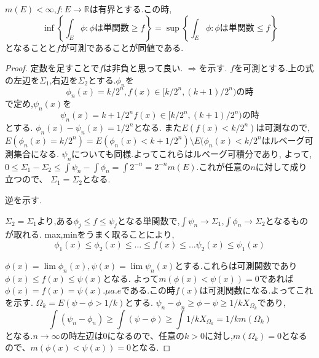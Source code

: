 \begin{thm}
 $m(E) < \infty$,$f: E \to \mathbb{R}$は有界とする.この時,
 \begin{equation*}
     \inf \left\{ \int_E \phi: \phi \mbox{は単関数} \ge f \right\} = \sup \left\{ \int_E \phi: \phi \mbox{は単関数} \le f\right\}
 \end{equation*}
となることと$f$が可測であることが同値である.
\end{thm}
\begin{proof}
定数を足すことで$f$は非負と思って良い.
$\Rightarrow$を示す. $f$を可測とする.上の式の左辺を$\Sigma_1$,右辺を$\Sigma_2$とする.$\phi_n$を
\begin{equation*}
    \phi_n(x) = 
    k/2^n, f(x) \in [k/2^n, (k+1)/2^n) \mbox{の時}
\end{equation*}
で定め,$\psi_n(x)$を
\begin{equation*}
    \psi_n(x) = k+1/2^n  f(x) \in [k/2^n, (k+1)/2^n) \mbox{の時}
\end{equation*}
とする.
$\phi_n(x) - \psi_n(x) = 1/2^n$となる.
また$E(f(x) < k/2^n)$は可測なので,$E(\phi_n(x) = k/2^n) = E(\phi_n(x) < k+1/2^n) \setminus E(\phi_n(x) < k/2^n$はルベーグ可測集合になる.
$\psi_n$についても同様.よってこれらはルベーグ可積分であり,
よって,$0 \le \Sigma_1 - \Sigma_2 \le \int \psi_n - \int \phi_n = \int 2^{-n} = 2^{-n}m(E)$.これが任意の$n$に対して成り立つので、
$\Sigma_1 = \Sigma_2$となる.

逆を示す.

$\Sigma_2 = \Sigma_1$より,ある$\phi_j \le f \le \psi_j$となる単関数で,$\int \psi_n \to \Sigma_1$,$\int \phi_n \to \Sigma_2$となるものが取れる.
max,minをうまく取ることにより,
\begin{equation*}
    \phi_1(x) \le \phi_2(x) \le \ldots \le f(x) \le \ldots \psi_2(x) \le \psi_1(x)
\end{equation*}

$\phi(x) = \lim \phi_n(x), \psi(x) = \lim \psi_n(x)$とする.これらは可測関数であり$\phi(x) \le f(x) \le \psi(x)$となる.
よって$m(\phi(x) < \psi(x)) = 0$であれば$\phi(x) = f(x) = \psi(x) .\mu a.e$である.この時$f(x)$は可測関数になる.よってこれを示す.
$\Omega_k = E(\psi - \phi > 1/k)$とする.
$\psi_n - \phi_n \ge \phi - \psi \ge 1/k X_{\Omega_k}$であり,
\begin{equation*}
    \int (\psi_n - \phi_n) \ge \int (\psi - \phi) \ge \int 1/k X_{\Omega_k} = 1/k m(\Omega_k)
\end{equation*}
となる.$n \to \infty$の時左辺は0になるので、任意の$k > 0$に対し,$m(\Omega_k) = 0$となるので、$m(\phi(x) < \psi(x)) = 0$となる.
\end{proof}

